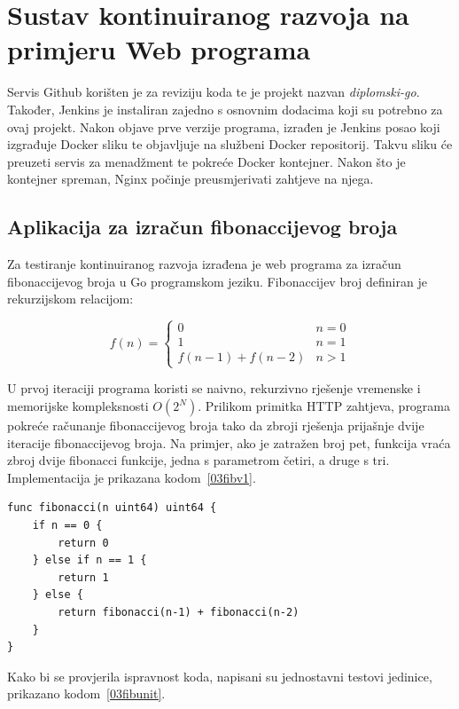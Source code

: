\chapter{Sustav kontinuiranog razvoja na primjeru Web programa}
Servis Github korišten je za reviziju koda te je projekt nazvan \textit{diplomski-go}. Također,
Jenkins je instaliran zajedno s osnovnim dodacima koji su potrebno za ovaj projekt. Nakon objave
prve verzije programa, izrađen je Jenkins posao koji izgrađuje Docker sliku te objavljuje na
službeni Docker repositorij. Takvu sliku će preuzeti servis za menadžment te pokreće Docker
kontejner. Nakon što je kontejner spreman, Nginx počinje preusmjerivati zahtjeve na njega.

\section{Aplikacija za izračun fibonaccijevog broja}
Za testiranje kontinuiranog razvoja izrađena je web programa za izračun fibonaccijevog broja u Go
programskom jeziku. Fibonaccijev broj definiran je rekurzijskom relacijom:

\begin{equation*}
    f(n) = \begin{cases}
               0               & n = 0\\
               1               & n = 1\\
               f(n-1) + f(n-2) & n > 1
           \end{cases}
\end{equation*}

U prvoj iteraciji programa koristi se naivno, rekurzivno rješenje vremenske i memorijske
kompleksnosti $O(2^N)$. Prilikom primitka HTTP zahtjeva, programa pokreće računanje fibonaccijevog
broja tako da zbroji rješenja prijašnje dvije iteracije fibonaccijevog broja. Na primjer, ako je
zatražen broj pet, funkcija vraća zbroj dvije fibonacci funkcije, jedna s parametrom četiri, a druge
s tri. Implementacija je prikazana kodom~\ref{03fibv1}.

\begin{lstlisting}
func fibonacci(n uint64) uint64 {
	if n == 0 {
		return 0
	} else if n == 1 {
		return 1
	} else {
		return fibonacci(n-1) + fibonacci(n-2)
	}
}
\end{lstlisting}

Kako bi se provjerila ispravnost koda, napisani su jednostavni testovi jedinice, prikazano
kodom~\ref{03fibunit}.

